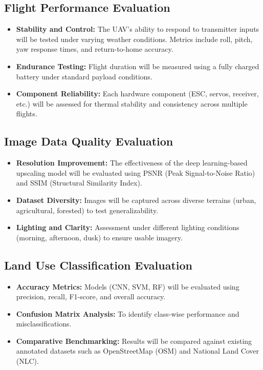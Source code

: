 \subsection{Flight Performance Evaluation}
\begin{itemize}
    \item \textbf{Stability and Control:} The UAV's ability to respond to transmitter inputs will be tested under varying weather conditions. Metrics include roll, pitch, yaw response times, and return-to-home accuracy.
    \item \textbf{Endurance Testing:} Flight duration will be measured using a fully charged battery under standard payload conditions.
    \item \textbf{Component Reliability:} Each hardware component (ESC, servos, receiver, etc.) will be assessed for thermal stability and consistency across multiple flights.
\end{itemize}

\subsection{Image Data Quality Evaluation}
\begin{itemize}
    \item \textbf{Resolution Improvement:} The effectiveness of the deep learning-based upscaling model will be evaluated using PSNR (Peak Signal-to-Noise Ratio) and SSIM (Structural Similarity Index).
    \item \textbf{Dataset Diversity:} Images will be captured across diverse terrains (urban, agricultural, forested) to test generalizability.
    \item \textbf{Lighting and Clarity:} Assessment under different lighting conditions (morning, afternoon, dusk) to ensure usable imagery.
\end{itemize}

\subsection{Land Use Classification Evaluation}
\begin{itemize}
    \item \textbf{Accuracy Metrics:} Models (CNN, SVM, RF) will be evaluated using precision, recall, F1-score, and overall accuracy.
    \item \textbf{Confusion Matrix Analysis:} To identify class-wise performance and misclassifications.
    \item \textbf{Comparative Benchmarking:} Results will be compared against existing annotated datasets such as OpenStreetMap (OSM) and National Land Cover (NLC).
\end{itemize}

